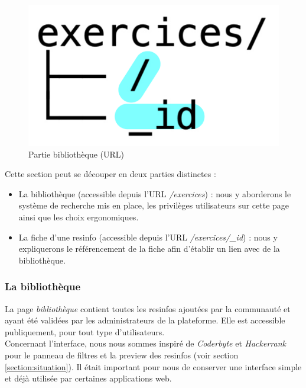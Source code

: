 \begin{figure}[H]
    \includegraphics[width=\textwidth,height=0.08\textheight,keepaspectratio]{images/client/exercices.jpeg}
    \centering
    \caption[SourceCode : partie bibliothèque]{Partie bibliothèque (URL)}
\end{figure}

Cette section peut se découper en deux parties distinctes :

\begin{itemize}
    \item La bibliothèque (accessible depuis l'URL \textit{/exercices}) : nous y aborderons le système de recherche mis en place, les privilèges utilisateurs sur cette page ainsi que les choix ergonomiques.\\
    \item La \gls{fiche} d'une \gls{resinfo} (accessible depuis l'URL \textit{/exercices/\_id}) : nous y expliquerons le référencement de la \gls{fiche} afin d'établir un lien avec de la bibliothèque.
\end{itemize}

\subsubsection{La bibliothèque}

La page \textit{bibliothèque} contient toutes les \glspl{resinfo} ajoutées par la communauté et ayant été validées par les administrateurs de la plateforme. Elle est accessible publiquement, pour tout type d'utilisateurs.\\

Concernant l'interface, nous nous sommes inspiré de \textit{Coderbyte} et \textit{Hackerrank} pour le panneau de filtres et la preview des \glspl{resinfo} (voir section \ref{section:situation}). Il était important pour nous de conserver une interface simple et déjà utilisée par certaines applications web.

